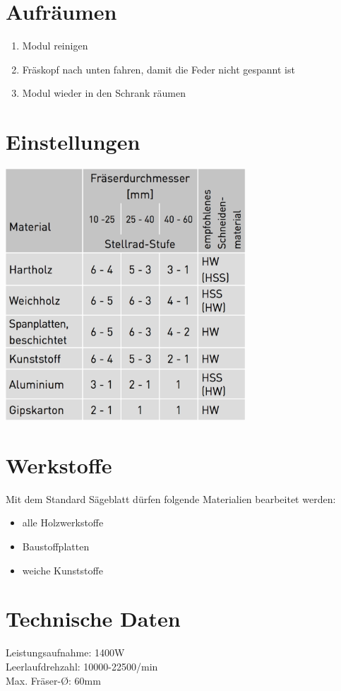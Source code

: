 \documentclass[10pt]{article}
\begin{document}
\section{Aufräumen}
\begin{enumerate}
\item Modul reinigen
\item Fräskopf nach unten fahren, damit die Feder nicht gespannt ist
\item Modul wieder in den Schrank räumen
\end{enumerate}

\section{Einstellungen}
\includegraphics[width=9cm]{images/fraese_drehzahl.png}

\section{Werkstoffe}
Mit dem Standard Sägeblatt dürfen folgende Materialien bearbeitet werden:
\begin{itemize}
\item alle Holzwerkstoffe
\item Baustoffplatten
\item weiche Kunststoffe
\end{itemize}

\section{Technische Daten}
Leistungsaufnahme: 1400W\\
Leerlaufdrehzahl: 10000-22500/min\\
Max. Fräser-Ø: 60mm


\end{document}
